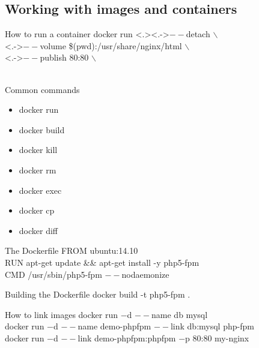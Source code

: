 \documentclass{beamer}
\begin{document}
    \subsection{Working with images and containers}
    \begin{frame}{How to run a container}
        \alert<+>{docker run}
        \alert<.>{\only<.->{$--$detach $\backslash$\\}}
        \alert<+>{\only<.->{$--$volume \$(pwd):/usr/share/nginx/html $\backslash$\\}}
        \alert<+>{\only<.->{$--$publish 80:80 $\backslash$\\}}
        \\
    \end{frame}
    \begin{frame}{Common commands}
        \begin{itemize}
            \item docker run
            \item docker build
            \item docker kill
            \item docker rm
            \item docker exec
            \item docker cp
            \item docker diff
        \end{itemize}
    \end{frame}
    \begin{frame}{The Dockerfile}
        \alert<+>{}
        \alert<+>{FROM ubuntu:14.10\\}
        \alert<+>{RUN apt-get update \&\& apt-get install -y php5-fpm\\}
        \alert<+>{CMD /usr/sbin/php5-fpm $--$nodaemonize\\}
    \end{frame}
    \begin{frame}{Building the Dockerfile}
        docker build -t php5-fpm .
    \end{frame}
    \begin{frame}{How to link images}
        docker run $-$d \alert<2>{$--$name db} mysql\\
        docker run $-$d \alert<3>{$--$name demo-phpfpm} {$--$link} \alert<2>{db}:mysql php-fpm\\
        docker run $-$d $--$link \alert<3>{demo-phpfpm}:phpfpm $-$p 80:80 my-nginx\\
    \end{frame}
\end{document}
